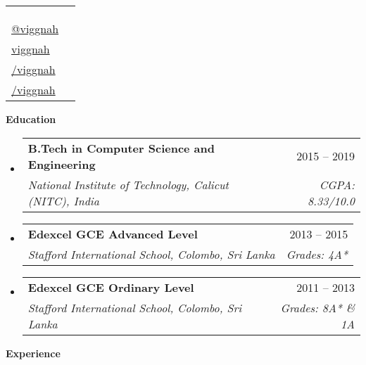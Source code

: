 \documentclass[letterpaper,12pt]{article}[leftmargin=*]
\makeatletter
\def \fullname {Viggnah Selvaraj}
\def \subtitle {}
\def \linkedinicon {\faLinkedin}
\def \linkedinlink {https://linkedin.com/in/viggnah/}
\def \linkedintext {/viggnah}
\def \phoneicon {\faPhoneSquare}
\def \phonetext {+94 77 109 4041}
\def \addressicon {\faHome}
\def \addresstext {224/1, Pickerings Rd, Colombo 13}
\def \nicicon {\faCreditCard}
\def \nictext {972594580V}
\def \emailicon {\faEnvelope}
\def \emaillink {mailto:viggnahselvaraj@hotmail.com}
\def \emailtext {viggnahselvaraj@hotmail.com}
\def \githubicon {\faGithub}
\def \githublink {https://github.com/viggnah}
\def \githubtext {/viggnah}
\def \websiteicon {\faMedium}
\def \websitelink {https://medium.com/@viggnah}
\def \websitetext {@viggnah}
\def \stackoverflowicon {\faStackOverflow}
\def \stackoverflowlink {https://stackoverflow.com/users/19261326/viggnah}
\def \stackoverflowtext {viggnah}
\def \headertype {\singlecol} %
\def \entryspacing {-0pt}
\def \linkedin {\linkedinicon \hspace{3pt}\href{\linkedinlink}{\linkedintext}}
\def \phone {\phoneicon \hspace{3pt}{ \phonetext}}
\def \address {\addressicon \hspace{3pt}{ \addresstext}}
\def \nic {\nicicon \hspace{3pt}{ \nictext}}
\def \email {\emailicon \hspace{3pt}\href{\emaillink}{\emailtext}}
\def \github {\githubicon \hspace{3pt}\href{\githublink}{\githubtext}}
\def \website {\websiteicon \hspace{3pt}\href{\websitelink}{\websitetext}}
\def \stackoverflow {\stackoverflowicon \hspace{3pt}\href{\stackoverflowlink}{\stackoverflowtext}}
\renewcommand{\section}[2]{\vspace{5pt}
  \colorbox{secondary}{\color{white}\raggedbottom\normalsize\textbf{{#1}{\hspace{7pt}#2}}}
}
\newcommand{\resumeEntryStart}{\begin{itemize}[leftmargin=2.5mm]}
\newcommand{\resumeEntryEnd}{\end{itemize}\vspace{\entryspacing}}
\newcommand{\resumeEntryTSDL}[4]{
  \vspace{-1pt}\item[]
    \begin{tabularx}{0.97\textwidth}{X@{\hspace{60pt}}r}
      \textbf{\color{primary}#1} & {\firabook\color{accent}\small#2} \\
      \textit{\color{accent}\small#3} & \textit{\color{accent}\small#4} \\
    \end{tabularx}\vspace{-6pt}
}
\newcommand{\resumeEntryS}[2]{
  \item[]\small{
    \textbf{\color{primary}#1 }{ #2 \vspace{-6pt}}
  }
}
\newcommand{\doublecol}[6]{
  \begin{tabularx}{\textwidth}{Xr}
    {
      \begin{tabular}[c]{l}
        \fontsize{35}{45}\selectfont{\color{primary}{{\textbf{\fullname}}}} \\
        {\textit{\subtitle}} %
      \end{tabular}
    } & {
      \begin{tabular}[c]{l@{\hspace{1.5em}}l}
        {\small#4} & {\small#1} \\
        {\small#5} & {\small#2} \\
        {\small#6} & {\small#3}
      \end{tabular}
    }
  \end{tabularx}
}
\newcommand{\singlecol}[6]{
  \begin{tabularx}{\textwidth}{Xr}
    {
      \begin{tabular}[b]{l}
        \fontsize{35}{45}\selectfont{\color{primary}{{\textbf{\fullname}}}} \\
        {\textit{\subtitle}} %
      \end{tabular}
    } & {
      \begin{tabular}[c]{l}
        {\small#1} \\
        {\small#2} \\
        {\small#3} \\
        {\small#4} \\
        {\small#5} \\
        {\small#6}
      \end{tabular}
    }
  \end{tabularx}
}
\makeatother
\begin{document}


\headertype{\email}{\phone}{\website}{\stackoverflow}{\github}{\linkedin} %
\vspace{-35pt} %



\section{\faGraduationCap}{Education}

  \resumeEntryStart
    \resumeEntryTSDL
      {B.Tech in Computer Science and Engineering}{2015 -- 2019}
      {National Institute of Technology, Calicut (NITC), India}{CGPA: 8.33/10.0}
  \resumeEntryEnd 

  \resumeEntryStart     
    \resumeEntryTSDL
      {Edexcel GCE Advanced Level}{2013 -- 2015}
      {Stafford International School, Colombo, Sri Lanka}{Grades: 4A*}
  \resumeEntryEnd

  \resumeEntryStart     
    \resumeEntryTSDL
      {Edexcel GCE Ordinary Level}{2011 -- 2013}
      {Stafford International School, Colombo, Sri Lanka}{Grades: 8A* \& 1A}
  \resumeEntryEnd
  
\section{\faIndustry}{Experience}
\end{document}
